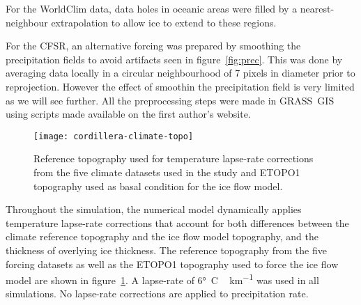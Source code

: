 For the WorldClim data, data holes in oceanic areas were filled by a nearest-neighbour extrapolation to allow ice to extend to these regions.

For the CFSR, an alternative forcing was prepared by smoothing the precipitation fields to avoid artifacts seen in figure~\ref{fig:prec}. This was done by averaging data locally in a circular neighbourhood of 7 pixels in diameter prior to reprojection. However the effect of smoothin the precipitation field is very limited as we will see further. All the preprocessing steps were made in GRASS~GIS using scripts made available on the first author's website.

\begin{figure}[t]
	\vspace*{2mm}
	\begin{center}
		\texttt{[image: cordillera-climate-topo]}
	\end{center}
	\caption{Reference topography used for temperature lapse-rate corrections from the five climate datasets used in the study and ETOPO1 topography used as basal condition for the ice flow model.}
	\label{fig:topo}
\end{figure}

Throughout the simulation, the numerical model dynamically applies temperature lapse-rate corrections that account for both differences between the climate reference topography and the ice flow model topography, and the thickness of overlying ice thickness. The reference topography from the five forcing datasets as well as the ETOPO1\citep{data:etopo1} topography used to force the ice flow model are shown in figure~\ref{fig:topo}. A lapse-rate of 6\unit{\degree C\,km^{-1}} was used in all simulations. No lapse-rate corrections are applied to precipitation rate.

